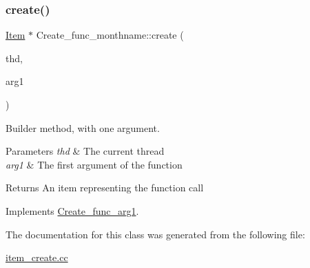 \subsubsection{\texorpdfstring{create()}{create()}}
{\footnotesize\ttfamily \mbox{\hyperlink{classItem}{Item}} $\ast$ Create\+\_\+func\+\_\+monthname\+::create (\begin{DoxyParamCaption}\item[{T\+HD $\ast$}]{thd,  }\item[{\mbox{\hyperlink{classItem}{Item}} $\ast$}]{arg1 }\end{DoxyParamCaption})\hspace{0.3cm}{\ttfamily [virtual]}}

Builder method, with one argument. 
\begin{DoxyParams}{Parameters}
{\em thd} & The current thread \\
\hline
{\em arg1} & The first argument of the function \\
\hline
\end{DoxyParams}
\begin{DoxyReturn}{Returns}
An item representing the function call 
\end{DoxyReturn}


Implements \mbox{\hyperlink{classCreate__func__arg1_a3e9a98f755cd82c3e762e334c955a8c9}{Create\+\_\+func\+\_\+arg1}}.



The documentation for this class was generated from the following file\+:\begin{DoxyCompactItemize}
\item 
\mbox{\hyperlink{item__create_8cc}{item\+\_\+create.\+cc}}\end{DoxyCompactItemize}
